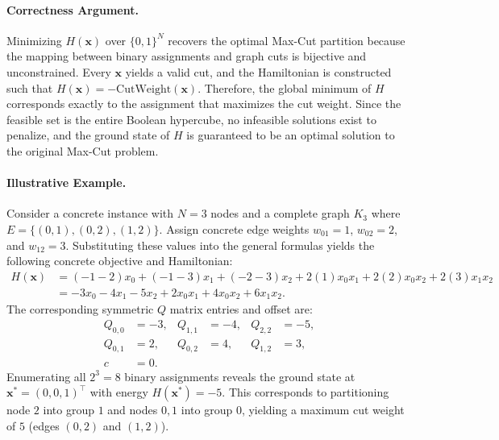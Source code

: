\documentclass[12pt]{article}
\begin{document}
\paragraph{Correctness Argument.}
Minimizing $H(\mathbf{x})$ over $\{0,1\}^N$ recovers the optimal Max-Cut partition because the mapping between binary assignments and graph cuts is bijective and unconstrained. Every $\mathbf{x}$ yields a valid cut, and the Hamiltonian is constructed such that $H(\mathbf{x}) = -\text{CutWeight}(\mathbf{x})$. Therefore, the global minimum of $H$ corresponds exactly to the assignment that maximizes the cut weight. Since the feasible set is the entire Boolean hypercube, no infeasible solutions exist to penalize, and the ground state of $H$ is guaranteed to be an optimal solution to the original Max-Cut problem.

\paragraph{Illustrative Example.}
Consider a concrete instance with $N=3$ nodes and a complete graph $K_3$ where $E = \{(0,1), (0,2), (1,2)\}$. Assign concrete edge weights $w_{01} = 1$, $w_{02} = 2$, and $w_{12} = 3$. Substituting these values into the general formulas yields the following concrete objective and Hamiltonian:
\begin{align}
    H(\mathbf{x}) &= (-1-2)x_0 + (-1-3)x_1 + (-2-3)x_2 + 2(1)x_0 x_1 + 2(2)x_0 x_2 + 2(3)x_1 x_2 \\
    &= -3x_0 - 4x_1 - 5x_2 + 2x_0 x_1 + 4x_0 x_2 + 6x_1 x_2.
\end{align}
The corresponding symmetric $Q$ matrix entries and offset are:
\begin{align}
    Q_{0,0} &= -3, & Q_{1,1} &= -4, & Q_{2,2} &= -5, \\
    Q_{0,1} &= 2, & Q_{0,2} &= 4, & Q_{1,2} &= 3, \\
    c &= 0.
\end{align}
Enumerating all $2^3 = 8$ binary assignments reveals the ground state at $\mathbf{x}^* = (0, 0, 1)^\top$ with energy $H(\mathbf{x}^*) = -5$. This corresponds to partitioning node $2$ into group $1$ and nodes $0, 1$ into group $0$, yielding a maximum cut weight of $5$ (edges $(0,2)$ and $(1,2)$).
\end{document}
